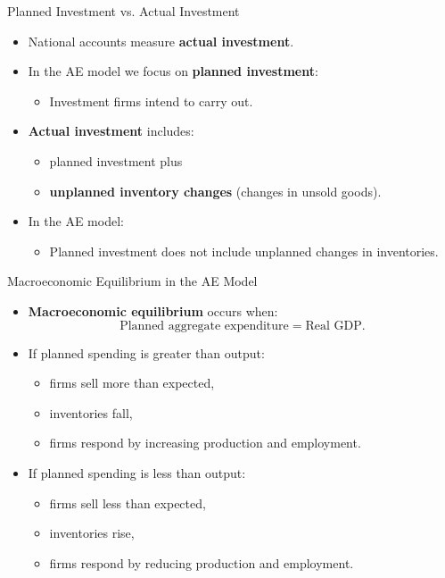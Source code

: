 \documentclass[aspectratio=169]{beamer}
\begin{document}
\begin{frame}{Planned Investment vs. Actual Investment}
\transfade
\begin{itemize}[<+->]
  \item National accounts measure \textbf{actual investment}.
  \item In the AE model we focus on \textbf{planned investment}:
  \begin{itemize}[<+->]
    \item Investment firms intend to carry out.
  \end{itemize}
  \item \textbf{Actual investment} includes:
  \begin{itemize}[<+->]
    \item planned investment plus
    \item \textbf{unplanned inventory changes} (changes in unsold goods).
  \end{itemize}
  \item In the AE model:
  \begin{itemize}[<+->]
    \item Planned investment does not include unplanned changes in inventories.
  \end{itemize}
\end{itemize}
\end{frame}

\begin{frame}{Macroeconomic Equilibrium in the AE Model}
\transfade
\begin{itemize}[<+->]
  \item \textbf{Macroeconomic equilibrium} occurs when:
  \[
    \text{Planned aggregate expenditure} = \text{Real GDP}.
  \]
  \item If planned spending is greater than output:
  \begin{itemize}[<+->]
    \item firms sell more than expected,
    \item inventories fall,
    \item firms respond by increasing production and employment.
  \end{itemize}
  \item If planned spending is less than output:
  \begin{itemize}[<+->]
    \item firms sell less than expected,
    \item inventories rise,
    \item firms respond by reducing production and employment.
  \end{itemize}
\end{itemize}
\end{frame}
\end{document}
